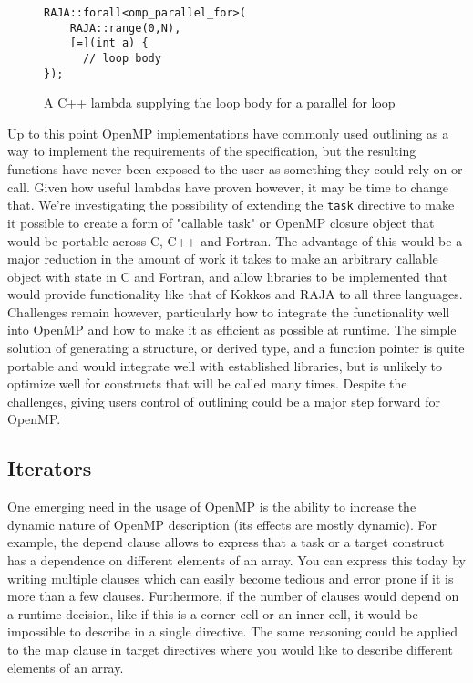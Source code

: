 \begin{figure}
\begin{verbatim}
RAJA::forall<omp_parallel_for>(
    RAJA::range(0,N),
    [=](int a) {
      // loop body
});
\end{verbatim}
\caption{A C++ lambda supplying the loop body for a parallel for loop}
\label{fig:raja}
\end{figure}
   
Up to this point OpenMP implementations have commonly used outlining as a way to
implement the requirements of the specification, but the resulting functions
have never been exposed to the user as something they could rely on or call.
Given how useful lambdas have proven however, it may be time to change that.
We're investigating the possibility of extending the \texttt{task} directive to
make it possible to create a form of "callable task" or OpenMP closure object
that would be portable across C, C++ and Fortran.  The advantage of this would
be a major reduction in the amount of work it takes to make an arbitrary
callable object with state in C and Fortran, and allow libraries to be
implemented that would provide functionality like that of Kokkos and RAJA to all
three languages.  Challenges remain however, particularly how to integrate the
functionality well into OpenMP and how to make it as efficient as possible at
runtime.  The simple solution of generating a structure, or derived type, and
a function pointer is quite portable and would integrate well with established
libraries, but is unlikely to optimize well for constructs that will be called
many times.  Despite the challenges, giving users control of outlining could be
a major step forward for OpenMP.

\subsection{Iterators}
\label{sub:iterators}

One emerging need in the usage of OpenMP is the ability to increase the dynamic
nature of OpenMP description (its effects are mostly dynamic). For example, the
depend clause allows to express that a task or a target construct has
a dependence on different elements of an array. You can express this today by
writing multiple clauses which can easily become tedious and error prone if it
is more than a few clauses. Furthermore, if the number of clauses would depend
on a runtime decision, like if this is a corner cell or an inner cell, it would
be impossible to describe in a single directive. The same reasoning could be
applied to the map clause in target directives where you would like to describe
different elements of an array.
   
